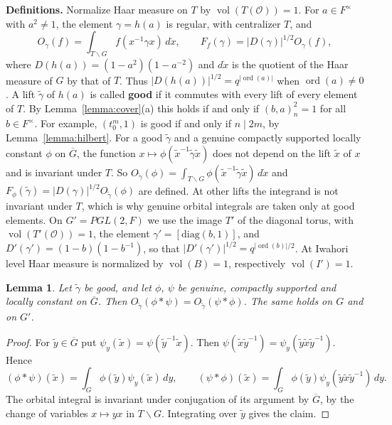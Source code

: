 \documentclass[12pt,letterpaper]{amsart}
\numberwithin{equation}{section}
\newtheorem{lemma}[theorem]{Lemma}
\theoremstyle{definition}
\theoremstyle{remark}
\DeclareMathOperator{\vol}{vol}
\DeclareMathOperator{\ord}{ord}
\newcommand{\cO}{\mathcal{O}}
\newcommand{\Gbar}{\overline{G}}
\begin{document}
\medskip\noindent\textbf{Definitions.} Normalize Haar measure on $T$
by $\vol(T(\cO))=1$. For $a\in F^\times$ with $a^2\neq 1$, the element
$\gamma=h(a)$ is regular, with centralizer $T$, and
\[
O_\gamma(f)=\int_{T\backslash G}f(x^{-1}\gamma x)\,d\dot x,\qquad
F_f(\gamma)=|D(\gamma)|^{1/2}O_\gamma(f),
\]
where $D(h(a))=(1-a^2)(1-a^{-2})$ and $d\dot x$ is the quotient of the
Haar measure of $G$ by that of $T$. Thus
$|D(h(a))|^{1/2}=q^{|\ord(a)|}$ when $\ord(a)\neq 0$. A lift
$\tilde\gamma$ of $h(a)$ is called \textbf{good} if it commutes with
every lift of every element of $T$. By Lemma~\ref{lemma:cover}(a)
this holds if and only if $(b,a)_n^2=1$ for all $b\in F^\times$. For
example, $(t_0^m,1)$ is good if and only if $n\mid 2m$, by
Lemma~\ref{lemma:hilbert}. For a good $\tilde\gamma$ and a genuine
compactly supported locally constant $\phi$ on $\Gbar$, the function
$x\mapsto\phi(\tilde x^{-1}\tilde\gamma\tilde x)$ does not depend on
the lift $\tilde x$ of $x$ and is invariant under $T$. So
$O_{\tilde\gamma}(\phi)=\int_{T\backslash G}\phi(\tilde
x^{-1}\tilde\gamma\tilde x)\,d\dot x$ and
$F_\phi(\tilde\gamma)=|D(\gamma)|^{1/2}O_{\tilde\gamma}(\phi)$ are
defined. At other lifts the integrand is not invariant under $T$,
which is why genuine orbital integrals are taken only at good
elements. On $G'=PGL(2,F)$ we use the image $T'$ of the diagonal
torus, with $\vol(T'(\cO))=1$, the element
$\gamma'=[\mathrm{diag}(b,1)]$, and $D'(\gamma')=(1-b)(1-b^{-1})$, so
that $|D'(\gamma')|^{1/2}=q^{|\ord(b)|/2}$. At Iwahori level Haar
measure is normalized by $\vol(B)=1$, respectively $\vol(I')=1$.

\begin{lemma}
\label{lemma:orbtrace}
Let $\tilde\gamma$ be good, and let $\phi$, $\psi$ be genuine,
compactly supported and locally constant on $\Gbar$. Then
$O_{\tilde\gamma}(\phi*\psi)=O_{\tilde\gamma}(\psi*\phi)$. The same
holds on $G$ and on $G'$.
\end{lemma}

\begin{proof}
For $\tilde y\in\Gbar$ put $\psi_y(\tilde x)=\psi(\tilde y^{-1}\tilde
x)$. Then $\psi(\tilde x\tilde y^{-1})=\psi_y(\tilde y\tilde x\tilde
y^{-1})$. Hence
\[
(\phi*\psi)(\tilde x)=\int_G\phi(\tilde y)\psi_y(\tilde x)\,dy,\qquad
(\psi*\phi)(\tilde x)=\int_G\phi(\tilde y)\psi_y(\tilde y\tilde
x\tilde y^{-1})\,dy .
\]
The orbital integral is invariant under conjugation of its argument by
$\Gbar$, by the change of variables $x\mapsto yx$ in
$T\backslash G$. Integrating over $\tilde y$ gives the claim.
\end{proof}
\end{document}
